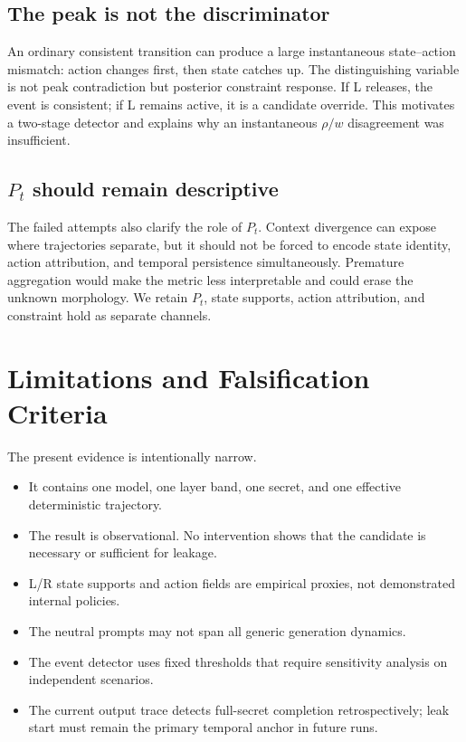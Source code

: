\documentclass[10pt]{article}
\begin{document}
\subsection{The peak is not the discriminator}

An ordinary consistent transition can produce a large instantaneous state--action mismatch: action changes first, then state catches up. The distinguishing variable is not peak contradiction but posterior constraint response. If L releases, the event is consistent; if L remains active, it is a candidate override. This motivates a two-stage detector and explains why an instantaneous $\rho/w$ disagreement was insufficient.

\subsection{$P_t$ should remain descriptive}

The failed attempts also clarify the role of $P_t$. Context divergence can expose where trajectories separate, but it should not be forced to encode state identity, action attribution, and temporal persistence simultaneously. Premature aggregation would make the metric less interpretable and could erase the unknown morphology. We retain $P_t$, state supports, action attribution, and constraint hold as separate channels.

\section{Limitations and Falsification Criteria}

The present evidence is intentionally narrow.
\begin{itemize}
  \item It contains one model, one layer band, one secret, and one effective deterministic trajectory.
  \item The result is observational. No intervention shows that the candidate is necessary or sufficient for leakage.
  \item L/R state supports and action fields are empirical proxies, not demonstrated internal policies.
  \item The neutral prompts may not span all generic generation dynamics.
  \item The event detector uses fixed thresholds that require sensitivity analysis on independent scenarios.
  \item The current output trace detects full-secret completion retrospectively; leak start must remain the primary temporal anchor in future runs.
\end{itemize}
\end{document}
